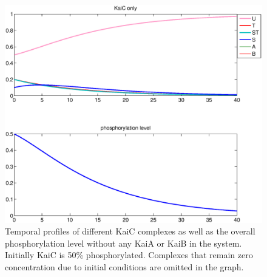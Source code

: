 \documentclass[a4paper,10pt]{article}
\numberwithin{equation}{section}
\begin{document}
\begin{figure}[H]
\centering
\includegraphics[scale=0.6]{Conly.eps}
\caption{\selectfont Temporal profiles of different KaiC complexes as well as the overall phosphorylation level without any KaiA or KaiB in the system. Initially KaiC is 50\% phosphorylated. Complexes that remain zero concentration due to initial conditions are omitted in the graph.}
\label{fig:conly}
\end{figure}
\end{document}
